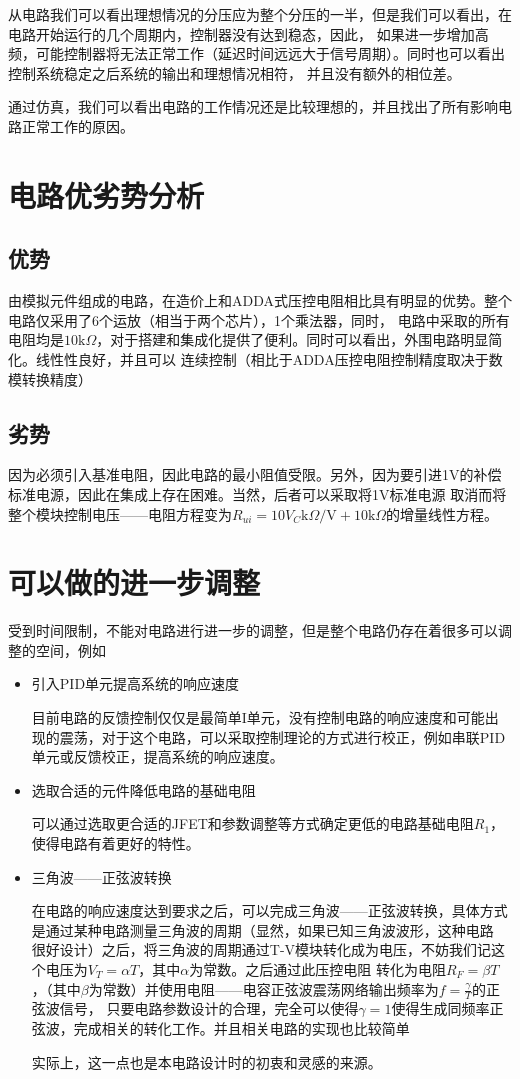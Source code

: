 \documentclass[UTF8,a4paper]{paper}
\begin{document}
从电路我们可以看出理想情况的分压应为整个分压的一半，但是我们可以看出，在电路开始运行的几个周期内，控制器没有达到稳态，因此，
如果进一步增加高频，可能控制器将无法正常工作（延迟时间远远大于信号周期）。同时也可以看出控制系统稳定之后系统的输出和理想情况相符，
并且没有额外的相位差。

通过仿真，我们可以看出电路的工作情况还是比较理想的，并且找出了所有影响电路正常工作的原因。

\section{电路优劣势分析}
\subsection{优势}
由模拟元件组成的电路，在造价上和ADDA式压控电阻相比具有明显的优势。整个电路仅采用了6个运放（相当于两个芯片），1个乘法器，同时，
电路中采取的所有电阻均是$10\mathrm{k}\Omega$，对于搭建和集成化提供了便利。同时可以看出，外围电路明显简化。线性性良好，并且可以
连续控制（相比于ADDA压控电阻控制精度取决于数模转换精度）
\subsection{劣势}
因为必须引入基准电阻，因此电路的最小阻值受限。另外，因为要引进1V的补偿标准电源，因此在集成上存在困难。当然，后者可以采取将1V标准电源
取消而将整个模块控制电压——电阻方程变为$R_{ui}=10V_C\mathrm{k}\Omega/\mathrm{V}+10\mathrm{k}\Omega$的增量线性方程。
\section{可以做的进一步调整}
受到时间限制，不能对电路进行进一步的调整，但是整个电路仍存在着很多可以调整的空间，例如
\begin{itemize}
\item 引入PID单元提高系统的响应速度

目前电路的反馈控制仅仅是最简单I单元，没有控制电路的响应速度和可能出现的震荡，对于这个电路，可以采取控制理论的方式进行校正，例如串联PID单元或反馈校正，提高系统的响应速度。

\item{选取合适的元件降低电路的基础电阻}

可以通过选取更合适的JFET和参数调整等方式确定更低的电路基础电阻$R_1$，使得电路有着更好的特性。

\item{三角波——正弦波转换}

在电路的响应速度达到要求之后，可以完成三角波——正弦波转换，具体方式是通过某种电路测量三角波的周期（显然，如果已知三角波波形，这种电路
很好设计）之后，将三角波的周期通过T-V模块转化成为电压，不妨我们记这个电压为$V_T=\alpha T$，其中$\alpha$为常数。之后通过此压控电阻
转化为电阻$R_F=\beta T$，（其中$\beta$为常数）并使用电阻——电容正弦波震荡网络输出频率为$f=\frac{\gamma}{T}$的正弦波信号，
只要电路参数设计的合理，完全可以使得$\gamma=1$使得生成同频率正弦波，完成相关的转化工作。并且相关电路的实现也比较简单

实际上，这一点也是本电路设计时的初衷和灵感的来源。

\end{itemize}
\end{document}
